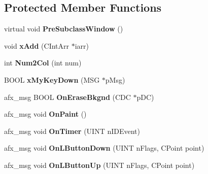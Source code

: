 \subsection*{Protected Member Functions}
\begin{DoxyCompactItemize}
\item 
\hypertarget{class_c_vis_a696c6df5f929a4e0b0672dfdf0625ed3}{virtual void {\bfseries Pre\-Subclass\-Window} ()}\label{class_c_vis_a696c6df5f929a4e0b0672dfdf0625ed3}

\item 
\hypertarget{class_c_vis_afd6ea8253444bec555ad6221d9e2719b}{void {\bfseries x\-Add} (C\-Int\-Arr $\ast$iarr)}\label{class_c_vis_afd6ea8253444bec555ad6221d9e2719b}

\item 
\hypertarget{class_c_vis_a72db5fb3bd8200947884281014f5c5b8}{int {\bfseries Num2\-Col} (int num)}\label{class_c_vis_a72db5fb3bd8200947884281014f5c5b8}

\item 
\hypertarget{class_c_vis_ae8f3921b5b23e9236bdabf7ce3484cb6}{B\-O\-O\-L {\bfseries x\-My\-Key\-Down} (M\-S\-G $\ast$p\-Msg)}\label{class_c_vis_ae8f3921b5b23e9236bdabf7ce3484cb6}

\item 
\hypertarget{class_c_vis_a23ccf14bfb89fb1b4912c16612064171}{afx\-\_\-msg B\-O\-O\-L {\bfseries On\-Erase\-Bkgnd} (C\-D\-C $\ast$p\-D\-C)}\label{class_c_vis_a23ccf14bfb89fb1b4912c16612064171}

\item 
\hypertarget{class_c_vis_a1d5928e4f72a5ffc9feb2f2fc1a1f3ee}{afx\-\_\-msg void {\bfseries On\-Paint} ()}\label{class_c_vis_a1d5928e4f72a5ffc9feb2f2fc1a1f3ee}

\item 
\hypertarget{class_c_vis_acde8a90c162ef9b2bb3636ecf69966e9}{afx\-\_\-msg void {\bfseries On\-Timer} (U\-I\-N\-T n\-I\-D\-Event)}\label{class_c_vis_acde8a90c162ef9b2bb3636ecf69966e9}

\item 
\hypertarget{class_c_vis_a1be7d04c60161154bbea6afb782f110f}{afx\-\_\-msg void {\bfseries On\-L\-Button\-Down} (U\-I\-N\-T n\-Flags, C\-Point point)}\label{class_c_vis_a1be7d04c60161154bbea6afb782f110f}

\item 
\hypertarget{class_c_vis_aec1ef092d2c3f479e2b4d663fa7ae8ec}{afx\-\_\-msg void {\bfseries On\-L\-Button\-Up} (U\-I\-N\-T n\-Flags, C\-Point point)}\label{class_c_vis_aec1ef092d2c3f479e2b4d663fa7ae8ec}


\end{DoxyCompactItemize}
